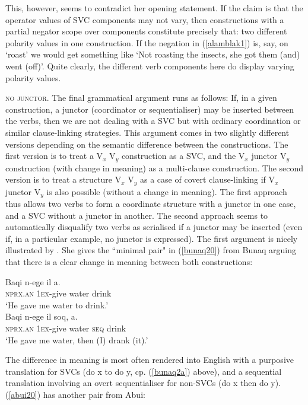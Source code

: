 This, however, seems to contradict her opening statement. If the claim is that the operator values of SVC components may not vary, then constructions with a partial negator scope over components constitute precisely that: two different polarity values in one construction. If the negation in (\ref{alamblak1}) is, say, on `roast' we would get something like `Not roasting the insects, she got them (and) went (off)'. Quite clearly, the different verb components here do display varying polarity values.

\textsc{no junctor}. The final grammatical argument runs as follows: If, in a given construction, a junctor (coordinator or sequentialiser) may be inserted between the verbs, then we are not dealing with a SVC but with ordinary coordination or similar clause-linking strategies. This argument comes in two slightly different versions depending on the semantic difference between the constructions. The first version is to treat a V$_x$ V$_y$ construction as a SVC, and the V$_x$ junctor V$_y$ construction (with change in meaning) as a multi-clause construction. The second version is to treat a structure V$_x$ V$_y$ as a case of covert clause-linking if V$_x$ junctor V$_y$ is also possible (without a change in meaning). The first approach thus allows two verbs to form a coordinate structure with a junctor in one case, and a SVC without a junctor in another. The second approach seems to automatically disqualify two verbs as serialised if a junctor may be inserted (even if, in a particular example, no junctor is expressed). The first argument is nicely illustrated by \citet{schapper2009bunaq}. She gives the ``minimal pair" in (\ref{bunaq20}) from Bunaq arguing that there is a clear change in meaning between both constructions:

\ea \label{bunaq20} 
\ea \label{bunaq2a}
\gll Baqi n-ege il a. \\
\textsc{nprx}.\textsc{an} \textsc{1}\textsc{ex}-give water drink \\
\glft `He gave me water to drink.’ \\ 
\ex
\gll Baqi n-ege il soq, a. \\ 
\textsc{nprx}.\textsc{an} \textsc{1}\textsc{ex}-give water \textsc{seq} drink \\
\glft `He gave me water, then (I) drank (it).’\\ 
\z
\z

The difference in meaning is most often rendered into English with a purposive translation for SVCs (do x to do y, cp. (\ref{bunaq2a}) above), and a sequential translation involving an overt sequentialiser for non-SVCs (do x then do y). (\ref{abui20}) has another pair from Abui:\newpage

